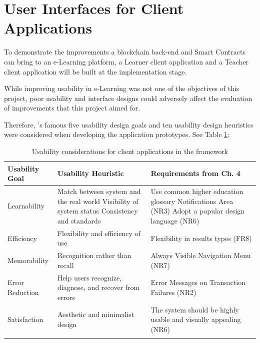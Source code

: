 \section{User Interfaces for Client Applications}

To demonstrate the improvements a blockchain back-end and Smart Contracts can bring to an e-Learning platform, a
Learner client application and a Teacher client application will be built at the implementation stage.

While improving usability in e-Learning was not one of the objectives of this project, poor usability and interface designs
could adversely affect the evaluation of improvements that this project aimed for.

Therefore, \citet{nielsen199510}'s famous five usability design goals and ten usability design heuristics
were considered when developing the application prototypes. See Table \ref{table:ux_considerations}:

\begin{table}[!ht]
	\caption[Usability considerations for client applications]
	{Usability considerations for client applications in the \citet{nielsen199510} framework}
	\centering
	\label{table:ux_considerations}
	\begin{tabularx}{\textwidth}{lXX}
		Usability Goal            & Usability Heuristic                                    & Requirements from Ch. 4                                         \\
		\toprule
		Learnability              & Match between system and the real world\newline
		Visibility of system status \newline
		Consistency and standards & Use common higher education glossary \newline
		Notifications Area (NR3) \newline
		Adopt a popular design language (NR6)                                                                                                                      \\
		\midrule
		Efficiency                & Flexibility and efficiency of use                       & Flexibility in results types (FR8)                              \\
		\midrule
		Memorability              & Recognition rather than recall                          & Always Visible Navigation Menu (NR7)                            \\
		\midrule
		Error Reduction           & Help users recognize, diagnose, and recover from errors & Error Messages on Transaction Failures (NR2)                         \\
		\midrule
		Satisfaction              & Aesthetic and minimalist design                         & The system should be highly usable and visually appealing (NR6) \\                                                               \\
		\bottomrule
	\end{tabularx}
\end{table}

